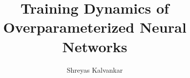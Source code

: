 \documentclass[twoside,a4paper,11pt]{memoir}
\title{Training Dynamics of Overparameterized Neural Networks}
\subtitle{}
\author{Shreyas Kalvankar}                               %
\theoremstyle{plain}
\theoremstyle{definition}
\theoremstyle{remark}
\begin{document}
\frontmatter
\thispagestyle{empty}
\maketitle                                      %
\makeformaltitlepages{}         %

 

\cleardoublepage\tableofcontents
\cleardoublepage\mainmatter












\appendix
\def\chaptername{Appendix}

% 
\end{document}
